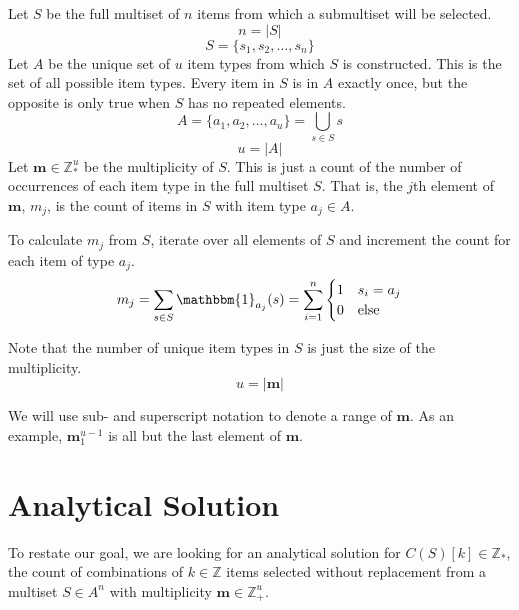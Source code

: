 \documentclass{article}
\begin{document}
Let $S$ be the full multiset of $n$ items from which a submultiset will be selected.
\begin{equation}
    n = \left | S \right | 
\end{equation} 
\begin{equation}
    S = \{ s_1, s_2, ..., s_n\}
\end{equation} 
Let $A$ be the unique set of $u$ item types from which $S$ is constructed. This is the set of all possible item types. Every item in $S$ is in $A$ exactly once, but the opposite is only true when $S$ has no repeated elements.
\begin{equation}
    A = \{ a_1, a_2, ..., a_u\} = \bigcup_{s\in S} s
\end{equation} 
\begin{equation}
    u = \left | A \right | 
\end{equation} 
Let $\bm{m} \in \mathbb{Z}_{*}^{u}$ be the multiplicity of $S$. This is just a count of the number of occurrences of each item type in the full multiset $S$. That is, the $j$th element of $\bm{m}$, $m_j$, is the count of items in $S$ with item type $a_j \in A$.

To calculate $m_j$ from $S$, iterate over all elements of $S$ and increment the count for each item of type $a_j$.
\begin{equation}
    m_j = \sum_{s \in S} \mathbbm{1}_{a_j}(s) = \sum_{i = 1}^n \begin{cases}1 & s_i = a_j \\ 0 & \text{else} \end{cases}
\end{equation} 

Note that the number of unique item types in $S$ is just the size of the multiplicity.
\begin{equation}
    u = |\bm{m}|
\end{equation} 

We will use sub- and superscript notation to denote a range of $\bm{m}$. As an example, $\bm{m}_{1}^{u - 1}$ is all but the last element of $\bm{m}$.

\section{Analytical Solution}

To restate our goal, we are looking for an analytical solution for $C(S)[k] \in \mathbb{Z}_{*}$, the count of combinations of $k \in \mathbb{Z}$ items selected without replacement from a multiset $S\in A^n$ with multiplicity $\bm{m} \in \mathbb{Z}_{+}^u$.
\end{document}
